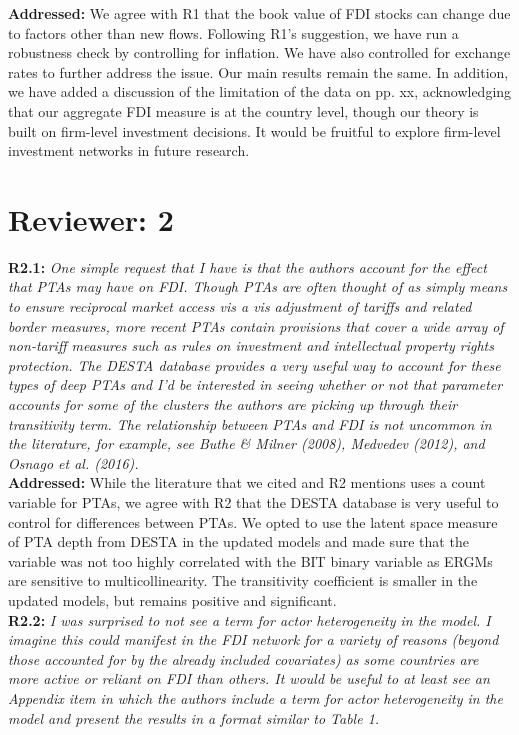 \documentclass[a4paper,11pt]{texMemo}
\begin{document}
\noindent \textbf{Addressed:} We agree with R1 that the book value of FDI stocks can change due to factors other than new flows. Following R1's suggestion, we have run a robustness check by controlling for inflation. We have also controlled for exchange rates to further address the issue. Our main results remain the same. In addition, we have added a discussion of the limitation of the data on pp. xx, acknowledging that our aggregate FDI measure is at the country level, though our theory is built on firm-level investment decisions. It would be fruitful to explore firm-level investment networks in future research.  \\

\section*{Reviewer: 2}


\noindent \textbf{R2.1:} \emph{One simple request that I have is that the authors account for the effect that PTAs may have on FDI. Though PTAs are often thought of as simply means to ensure reciprocal market access vis a vis adjustment of tariffs and related border measures, more recent PTAs contain provisions that cover a wide array of non-tariff measures such as rules on investment and intellectual property rights protection. The DESTA database provides a very useful way to account for these types of deep PTAs and I'd be interested in seeing whether or not that parameter accounts for some of the clusters the authors are picking up through their transitivity term. The relationship between PTAs and FDI is not uncommon in the literature, for example, see Buthe \& Milner (2008), Medvedev (2012), and Osnago et al. (2016).}\\

\noindent \textbf{Addressed:} While the literature that we cited and R2 mentions uses a count variable for PTAs, we agree with R2 that the DESTA database is very useful to control for differences between PTAs. We opted to use the latent space measure of PTA depth from DESTA  in the updated models and made sure that the variable was not too highly correlated with the BIT binary variable as ERGMs are sensitive to multicollinearity. The transitivity coefficient is smaller in the updated models, but remains positive and significant. \\

\noindent \textbf{R2.2:} \emph{I was surprised to not see a term for actor heterogeneity in the model. I imagine this could manifest in the FDI network for a variety of reasons (beyond those accounted for by the already included covariates) as some countries are more active or reliant on FDI than others. It would be useful to at least see an Appendix item in which the authors include a term for actor heterogeneity in the model and present the results in a format similar to Table 1.}\\
\end{document}
